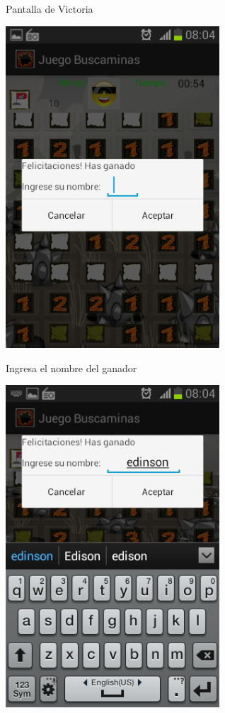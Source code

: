 \documentclass[11pt]{article} %
\begin{document}
\begin{center}
Pantalla de Victoria

\includegraphics[width=8cm]{imagenes/Screenshot_2013-12-11-08-04-22.png}
\end{center}

\begin{center}
Ingresa el nombre del ganador

\includegraphics[width=8cm]{imagenes/Screenshot_2013-12-11-08-04-40.png}
\end{center}
\end{document}
